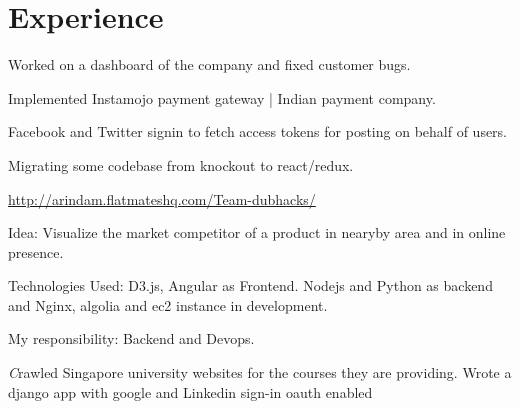 \documentclass[]{deedy-resume-openfont}
\begin{document}
\begin{minipage}[t]{0.66\textwidth}


\section{Experience}

\vspace{\topsep} %
\begin{tightemize}
\item Worked on a dashboard of the company and fixed customer bugs.
\item Implemented Instamojo payment gateway | Indian payment company.
\item Facebook and Twitter signin to fetch access tokens for posting on behalf of users.
\item Migrating some codebase from knockout to react/redux.
\vspace{\topsep} %
\end{tightemize}

{ \url{http://arindam.flatmateshq.com/Team-dubhacks/} }\\
\begin{tightemize}
\item Idea: Visualize the market competitor of a product in nearyby area and in online presence.
\item Technologies Used: D3.js, Angular as Frontend. Nodejs and Python as backend and Nginx, algolia and ec2 instance in development.
\item My responsibility: Backend and Devops.
\vspace{\topsep} %
\end{tightemize}

\begin{tightemize}
\item \emph Crawled Singapore university websites for the courses they are providing. Wrote a django app with google and Linkedin sign-in oauth enabled \end{tightemize}
\sectionsep


\end{minipage}
\end{document}
